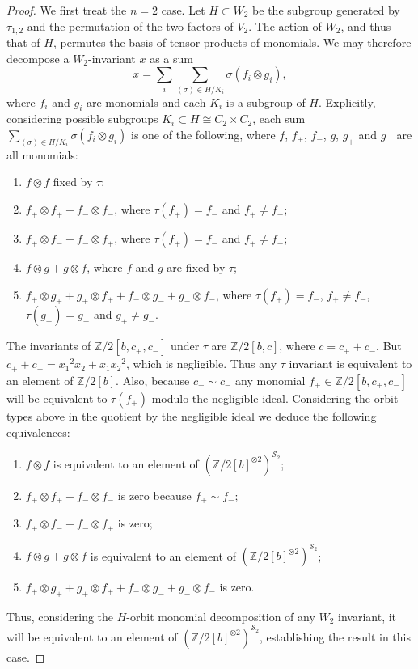 \documentclass[10pt,a4paper]{amsart}
\newcommand{\Z}{\mathbb{Z}}
\newcommand{\si}{\mathcal{S}}
\begin{document}
\begin{proof}
    We first treat the $n=2$ case.  Let $H \subset W_2$ be the subgroup generated by $\tau_{1,2}$ and the permutation of the two factors of $V_2$.   
    The action of $W_2$, and thus that of $H$, permutes the basis of tensor products of monomials.  We may therefore decompose a $W_2$-invariant $x$ as a sum 
    $$x = \sum_i \sum_{(\sigma) \in H/K_i} \sigma (f_i \otimes g_i),$$
    where $f_i$ and $g_i$ are monomials and 
    each $K_i$ is a subgroup of $H$.
      Explicitly, considering possible subgroups $K_i \subset H \cong C_2 \times C_2$, each sum
      $\sum_{(\sigma) \in H/K_i} \sigma (f_i \otimes g_i)$ is one of the following, where $f$, $f_+$, $f_-$, $g$, $g_+$ and $g_-$ are all monomials:
\begin{enumerate}
    \item $f \otimes f$ fixed by $\tau$;
    \item $f_+ \otimes f_+ + f_- \otimes f_-$, where $\tau(f_+) = f_-$ and $f_+ \neq f_-$;
    \item $f_+ \otimes f_- + f_- \otimes f_+$, where $\tau(f_+) = f_-$ and $f_+ \neq f_-$;
    \item $f \otimes g + g \otimes f$, where $f$ and $g$ are fixed by $\tau$;
    \item $f_+ \otimes g_+ + g_+ \otimes f_+ + f_- \otimes g_- 
    + g_- \otimes f_-$, where  $\tau(f_+) = f_-$, $f_+ \neq f_-$,$\tau(g_+) = g_-$ and $g_+ \neq g_-$.
\end{enumerate}
The invariants of $\Z/2[b,c_+,c_-]$ under $\tau$ are $\Z/2[b,c]$, where $c = c_+ + c_-$.  But  $c_+ +  c_- = {x_1}^2 x_2 + x_1 {x_2}^2$, which is negligible.  Thus any $\tau$ invariant is equivalent to an element of $\Z/2[b]$.  
Also, because $c_+ \sim c_-$  any monomial $f_+ \in \Z/2[b, c_+, c_-]$ will be equivalent to $\tau(f_+)$ modulo the negligible ideal.  Considering the orbit types above in the quotient by the negligible ideal we deduce
the following equivalences:
\begin{enumerate}
    \item $f \otimes f$ is equivalent to an element of $(\Z/2[b]^{\otimes 2})^{\si_2}$;
    \item $f_+ \otimes f_+ + f_- \otimes f_-$ is zero  because $f_+ \sim f_-$;
    \item $f_+ \otimes f_- + f_- \otimes f_+$ is zero;
    \item $f \otimes g + g \otimes f$ is equivalent to an element of $(\Z/2[b]^{\otimes 2})^{\si_2}$;
    \item $f_+ \otimes g_+ + g_+ \otimes f_+ + f_- \otimes g_- 
    + g_- \otimes f_-$ is zero.
\end{enumerate}
Thus, considering the $H$-orbit monomial decomposition of any $W_2$ invariant, it will be equivalent to an element of $(\Z/2[b]^{\otimes 2})^{\si_2}$, establishing the result in this case.



\end{proof}
\end{document}
